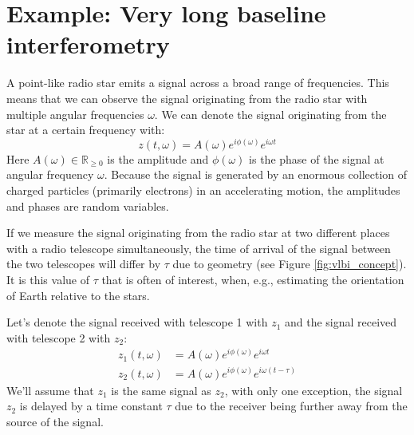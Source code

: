 \section{Example: Very long baseline interferometry}
A point-like radio star emits a signal across a broad range of frequencies. This means that we can observe the signal originating from the radio star with multiple angular frequencies $\omega$. We can denote the signal originating from the star at a certain frequency with:
\begin{equation}
z(t,\omega) = A(\omega) e^{i\phi(\omega)} e^{i\omega t}
\end{equation}
Here $A(\omega) \in \mathbb{R}_{\ge 0}$ is the amplitude and $\phi(\omega)$ is the phase of the signal at angular frequency $\omega$. Because the signal is generated by an enormous collection of charged particles (primarily electrons) in an accelerating motion, the amplitudes and phases are random variables.

If we measure the signal originating from the radio star at two different places with a radio telescope simultaneously, the time of arrival of the signal between the two telescopes will differ by $\tau$ due to geometry (see Figure \ref{fig:vlbi_concept}). It is this value of $\tau$ that is often of interest, when, e.g., estimating the orientation of Earth relative to the stars. 

Let's denote the signal received with telescope 1 with $z_1$ and the signal received with telescope 2 with $z_2$:
\begin{align}
z_1(t,\omega) &= A(\omega) e^{i\phi(\omega)} e^{i\omega t} \\
z_2(t,\omega) &= A(\omega) e^{i\phi(\omega)} e^{i\omega (t-\tau)}
\end{align}
We'll assume that $z_1$ is the same signal as $z_2$, with only one exception, the signal $z_2$ is delayed by a time constant $\tau$ due to the receiver being further away 
from the source of the signal.

